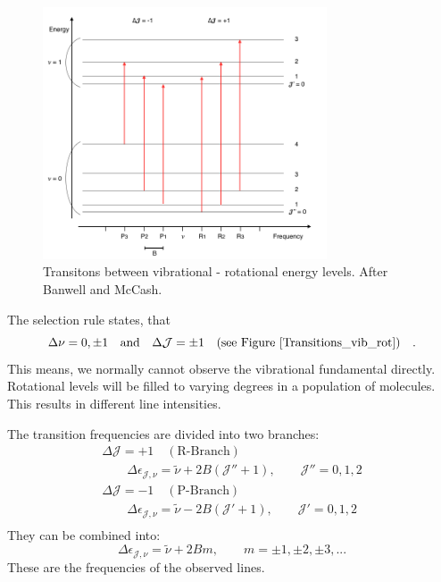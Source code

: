  \begin{figure}
\begin{center}
\includegraphics[width=0.75\textwidth]{figures/Transitions_vib_rot}
\caption{Transitons between vibrational - rotational energy levels. After Banwell and McCash.}
\label{Transitions_vib_rot}
\end{center}
\end{figure}
 
The selection rule states, that
\begin{equation}
\Delta \nu = 0,\pm 1 \quad \mathrm{and} \quad \Delta \mathcal{J} = \pm 1
\quad \text{(see Figure \ref{Transitions_vib_rot})} \quad .
\end{equation}
This means, we normally cannot observe the vibrational fundamental
directly. Rotational levels will be filled to varying degrees in a
population of molecules. This results in different line intensities. 

The transition frequencies are divided into two branches:
\begin{gather*}
\Delta \mathcal{J} = +1 \quad (\text{R-Branch}) \\
\qquad \Delta \epsilon_{\mathcal{J},\nu} = \tilde{\nu} + 2 B ( \mathcal{J''} + 1), 
	\qquad \mathcal{J''} = 0, 1, 2  \\
\Delta \mathcal{J} = -1 \quad (\text{P-Branch}) \\
\qquad \Delta \epsilon_{\mathcal{J},\nu} = \tilde{\nu} - 2 B ( \mathcal{J'} + 1) , 
	\qquad \mathcal{J'} = 0, 1, 2  \\ 
\end{gather*}
 They can be combined into: 
 \begin{equation}
\Delta \epsilon_{\mathcal{J},\nu} = \tilde{\nu} + 2 B m , 
	\qquad m = \pm1, \pm2, \pm3, ...
\end{equation}
These are the frequencies of the observed lines. 

